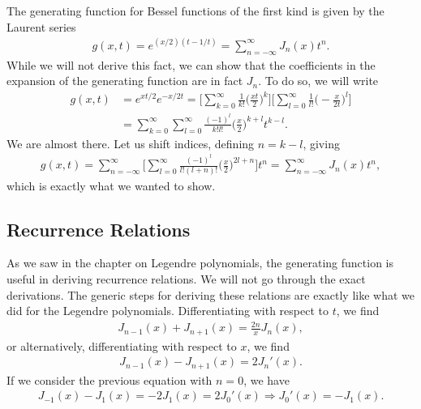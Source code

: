 The generating function for Bessel functions of the first kind is given by the Laurent series
\begin{align}
    g(x,t) = e^{(x/2)(t - 1/t)} = \sum_{n=-\infty}^{\infty} J_{n}(x) t^{n}
.\end{align}
While we will not derive this fact, we can show that the coefficients in the expansion of the generating function are in fact $J_{n}$.
To do so, we will write
\begin{align}
    g(x,t) &= e^{xt/2}e^{-x/2t} = \Bigg[ \sum_{k=0}^{\infty} \frac{1}{k!} \Big( \frac{xt}{2} \Big)^{k} \Bigg] \Bigg[ \sum_{l=0}^{\infty} \frac{1}{l!} \Big( -\frac{x}{2t} \Big)^{l} \Bigg] \nonumber \\
           &= \sum_{k=0}^{\infty} \sum_{l=0}^{\infty} \frac{(-1)^{l}}{k!l!} \Big( \frac{x}{2} \Big)^{k+l} t^{k-l}
.\end{align}
We are almost there.
Let us shift indices, defining $n = k - l$, giving
\begin{eqnarray}
    g(x,t) = \sum_{n=-\infty}^{\infty} \Bigg[ \sum_{l=0}^{\infty} \frac{(-1)^{l}}{l!(l+n)!} \Big( \frac{x}{2} \Big)^{2l+n} \Bigg] t^{n} = \sum_{n=-\infty}^{\infty} J_{n}(x) t^{n}
,\end{eqnarray}
which is exactly what we wanted to show.


\subsection{Recurrence Relations}

As we saw in the chapter on Legendre polynomials, the generating function is useful in deriving recurrence relations.
We will not go through the exact derivations.
The generic steps for deriving these relations are exactly like what we did for the Legendre polynomials.
Differentiating with respect to $t$, we find
\begin{eqnarray}
    \label{eq:rec-rel-t}
    J_{n-1}(x) + J_{n+1}(x) = \frac{2n}{x} J_{n}(x)
,\end{eqnarray}
or alternatively, differentiating with respect to $x$, we find
\begin{eqnarray}
    \label{eq:rec-rel-x}
    J_{n-1}(x) - J_{n+1}(x) = 2 J_{n}'(x)
.\end{eqnarray}
If we consider the previous equation with $n = 0$, we have
\begin{align}
    J_{-1}(x) - J_{1}(x) = -2 J_1(x) = 2 J_0'(x) \Rightarrow J_0'(x) = - J_1(x)
.\end{align}

